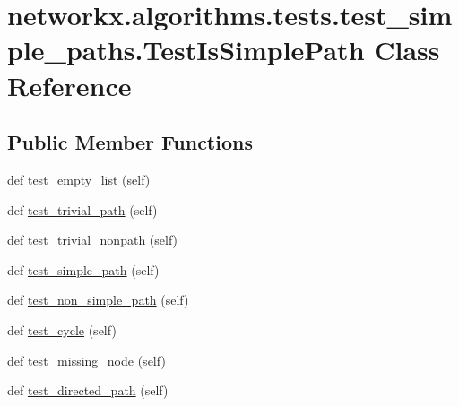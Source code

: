 \hypertarget{classnetworkx_1_1algorithms_1_1tests_1_1test__simple__paths_1_1TestIsSimplePath}{}\section{networkx.\+algorithms.\+tests.\+test\+\_\+simple\+\_\+paths.\+Test\+Is\+Simple\+Path Class Reference}
\label{classnetworkx_1_1algorithms_1_1tests_1_1test__simple__paths_1_1TestIsSimplePath}
\subsection*{Public Member Functions}
\begin{DoxyCompactItemize}
\item 
def \hyperlink{classnetworkx_1_1algorithms_1_1tests_1_1test__simple__paths_1_1TestIsSimplePath_af5a78cf0537a1eb9e708c5ecf95869f1}{test\+\_\+empty\+\_\+list} (self)
\item 
def \hyperlink{classnetworkx_1_1algorithms_1_1tests_1_1test__simple__paths_1_1TestIsSimplePath_a6aeebd2425aa2a5123ba3e77fc3de70e}{test\+\_\+trivial\+\_\+path} (self)
\item 
def \hyperlink{classnetworkx_1_1algorithms_1_1tests_1_1test__simple__paths_1_1TestIsSimplePath_a709992191df97e3803cdae179545363b}{test\+\_\+trivial\+\_\+nonpath} (self)
\item 
def \hyperlink{classnetworkx_1_1algorithms_1_1tests_1_1test__simple__paths_1_1TestIsSimplePath_a71af7e9bce29291a16d3bf11ec83e599}{test\+\_\+simple\+\_\+path} (self)
\item 
def \hyperlink{classnetworkx_1_1algorithms_1_1tests_1_1test__simple__paths_1_1TestIsSimplePath_ada969af7917da2a9a809dc47b33d579c}{test\+\_\+non\+\_\+simple\+\_\+path} (self)
\item 
def \hyperlink{classnetworkx_1_1algorithms_1_1tests_1_1test__simple__paths_1_1TestIsSimplePath_aa50505953527bf0a1c796a8dad34fb3f}{test\+\_\+cycle} (self)
\item 
def \hyperlink{classnetworkx_1_1algorithms_1_1tests_1_1test__simple__paths_1_1TestIsSimplePath_a9a39ae2cedd9eedca5efe00e01af343d}{test\+\_\+missing\+\_\+node} (self)
\item 
def \hyperlink{classnetworkx_1_1algorithms_1_1tests_1_1test__simple__paths_1_1TestIsSimplePath_a756e8d139655718d49d91ab7a531c8fe}{test\+\_\+directed\+\_\+path} (self)
\item 

\end{DoxyCompactItemize}
